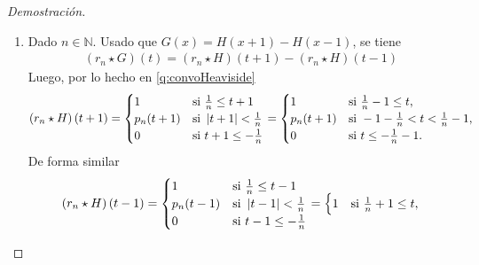 \documentclass[10pt,a4paper]{report}
\newcommand{\abs}[2][y]{\if#1y\left\fi\lvert#2\if#1y\right\fi\rvert}
\theoremstyle{definition}
\renewcommand{\theproblem}{\Alph{problem}}
\numberwithin{equation}{problem}
\providecommand{\abs}[1]{\left\lvert#1\right\rvert}
\begin{document}
\begin{proof}[\textcolor{rojo}{Demostración}]
\begin{enumerate}[label=\textbf{\theproblem.\arabic{*}.},ref=\theproblem.\arabic{*},parsep=1ex]
              \begin{align*}
              	\left(r_{n}\star H\right)(t) =  \begin{cases}
              		1 & \text{si } \frac{1}{n} \leq t,\\
              		p_{n}(t) & \text{si } \abs{t} < \frac{1}{n},\\
              		0 & \text{si } t \leq -\frac{1}{n}.
              	\end{cases}
              \end{align*}
              \item Dado $n\in\mathbb{N}$. Usado que $G(x) = H(x+1)-H(x-1)$, se tiene
              \begin{align*}
              	\left(r_{n}\star G \right)(t) = \left(r_{n}\star H\right)(t+1) - \left(r_{n}\star H\right)(t-1)
              \end{align*}
              Luego, por lo hecho en \ref{q:convoHeaviside}
              \begin{align*}
              	\left(r_{n}\star H\right)(t+1) =  \begin{cases}
              		1 & \text{si } \frac{1}{n} \leq t+1\\
              		p_{n}(t+1) & \text{si } \abs{t+1} < \frac{1}{n}\\
              		0 & \text{si } t+1 \leq -\frac{1}{n}
              	\end{cases} = \begin{cases}
              	1 & \text{si } \frac{1}{n}-1 \leq t,\\
              	p_{n}(t+1) & \text{si } -1-\frac{1}{n}< t < \frac{1}{n}-1,\\
              	0 & \text{si } t \leq -\frac{1}{n}-1.
              \end{cases}
              \end{align*}
              De forma similar
              \begin{align*}
              	\left(r_{n}\star H\right)(t-1) =  \begin{cases}
              		1 & \text{si } \frac{1}{n} \leq t-1\\
              		p_{n}(t-1) & \text{si } \abs{t-1} < \frac{1}{n}\\
              		0 & \text{si } t-1 \leq -\frac{1}{n}
              	\end{cases} = \begin{cases}
              		1 & \text{si } \frac{1}{n}+1 \leq t,\\

\end{cases}
\end{align*}
\end{enumerate}
\end{proof}
\end{document}
